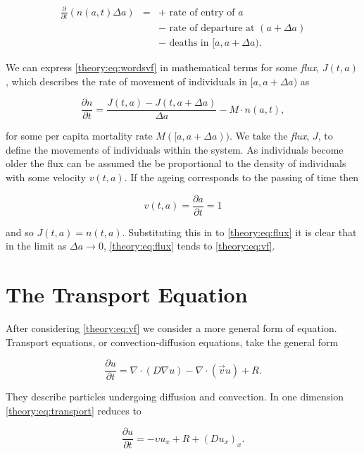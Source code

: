 \documentclass[../main.tex]{subfiles}
\begin{document}
  \begin{eqnarray}\label{theory:eq:wordsvf}
    \frac{\partial}{\partial t} \left( n(a, t) \Delta a \right)
    &=& + \mbox{ rate of entry of } a \nonumber \\
    && - \mbox{ rate of departure at } (a + \Delta a) \nonumber \\
    && - \mbox{ deaths in } [a, a + \Delta a).
  \end{eqnarray}

  We can express \autoref{theory:eq:wordsvf} in mathematical terms for some \emph{flux}, $J(t, a)$, which describes the rate of movement of individuals in $[a, a + \Delta a)$ as

  \begin{equation}\label{theory:eq:flux}
    \frac{\partial n}{\partial t} = \frac{J(t, a) - J(t, a + \Delta a)}{\Delta a} - M \cdot n(a, t),
  \end{equation}

  for some per capita mortality rate $M([a, a + \Delta a))$. We take the \emph{flux}, $J$, to define the movements of individuals within the system. As individuals become older the flux can be assumed the be proportional to the density of individuals with some velocity $v(t, a)$. If the ageing corresponds to the passing of time then

  $$ v(t, a) = \frac{\partial a}{\partial t} = 1$$

  and so $J(t, a) = n(t, a)$. Substituting this in to \autoref{theory:eq:flux} it is clear that in the limit as $\Delta a \to 0$, \autoref{theory:eq:flux} tends to \autoref{theory:eq:vf}.

  \section{The Transport Equation}\label{theory:sec:transport}
  After considering \autoref{theory:eq:vf} we consider a more general form of equation. Transport equations, or convection-diffusion equations, take the general form

  \begin{equation}\label{theory:eq:transport}
    \frac{\partial u}{\partial t} = \nabla \cdot (D \nabla u) - \nabla \cdot (\vec{v} u) + R.
  \end{equation}

  They describe particles undergoing diffusion and convection. In one dimension \autoref{theory:eq:transport} reduces to

  \begin{equation}\label{theory:eq:transport1d}
    \frac{\partial u}{\partial t} = - \upsilon u_x + R + (D u_x)_x.
  \end{equation}
\end{document}

